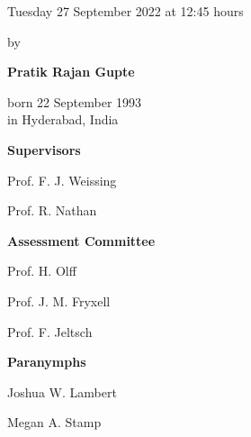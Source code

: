 \begin{titlepage}
\begin{addmargin}[-1cm]{-3cm}
\begin{center}
{            \vspace{3mm}

            Tuesday 27 September 2022 at 12:45 hours

            \vspace{10mm}

            by

            \vspace{10mm}

            \textbf{Pratik Rajan Gupte}

            \vspace{3mm}

            born 22 September 1993\\
            in Hyderabad, India
        }

    \end{center}

    \pagebreak
    \thispagestyle{empty}

    \textbf{Supervisors}
    \begin{description}
        \item Prof. F. J. Weissing
        \item Prof. R. Nathan
    \end{description}


    \textbf{Assessment Committee}
    \begin{description}
        \item Prof. H. Olff
        \item Prof. J. M. Fryxell
        \item Prof. F. Jeltsch
    \end{description}

    \vfill

    \textbf{Paranymphs}
    \begin{description}
        \item Joshua W. Lambert
        \item Megan A. Stamp
    \end{description}

  \end{addmargin}

\end{titlepage}
